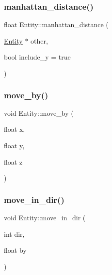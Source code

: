 \mbox{\label{classEntity_a5cd6b84c61bca6e206895d1bc7c8ad63}} 
\subsubsection{\texorpdfstring{manhattan\+\_\+distance()}{manhattan\_distance()}}
{\footnotesize\ttfamily float Entity\+::manhattan\+\_\+distance (\begin{DoxyParamCaption}\item[{\mbox{\hyperlink{classEntity}{Entity}} $\ast$}]{other,  }\item[{bool}]{include\+\_\+y = {\ttfamily true} }\end{DoxyParamCaption})}

\mbox{\label{classEntity_ac5c2ecde136877863c4fc512d2081b7a}} 
\subsubsection{\texorpdfstring{move\+\_\+by()}{move\_by()}}
{\footnotesize\ttfamily void Entity\+::move\+\_\+by (\begin{DoxyParamCaption}\item[{float}]{x,  }\item[{float}]{y,  }\item[{float}]{z }\end{DoxyParamCaption})}

\mbox{\label{classEntity_ad14803ac2db89cbd788302f1fc385b0e}} 
\subsubsection{\texorpdfstring{move\+\_\+in\+\_\+dir()}{move\_in\_dir()}}
{\footnotesize\ttfamily void Entity\+::move\+\_\+in\+\_\+dir (\begin{DoxyParamCaption}\item[{int}]{dir,  }\item[{float}]{by }\end{DoxyParamCaption})}

